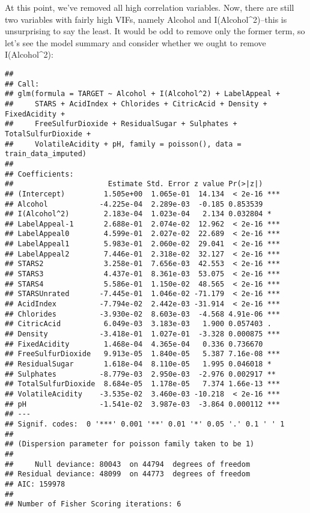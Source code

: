 \documentclass[
]{article}
\begin{document}
At this point, we've removed all high correlation variables. Now, there
are still two variables with fairly high VIFs, namely Alcohol and
I(Alcohol\^{}2)--this is unsurprising to say the least. It would be odd
to remove only the former term, so let's see the model summary and
consider whether we ought to remove I(Alcohol\^{}2):

\begin{verbatim}
## 
## Call:
## glm(formula = TARGET ~ Alcohol + I(Alcohol^2) + LabelAppeal + 
##     STARS + AcidIndex + Chlorides + CitricAcid + Density + FixedAcidity + 
##     FreeSulfurDioxide + ResidualSugar + Sulphates + TotalSulfurDioxide + 
##     VolatileAcidity + pH, family = poisson(), data = train_data_imputed)
## 
## Coefficients:
##                      Estimate Std. Error z value Pr(>|z|)    
## (Intercept)         1.505e+00  1.065e-01  14.134  < 2e-16 ***
## Alcohol            -4.225e-04  2.289e-03  -0.185 0.853539    
## I(Alcohol^2)        2.183e-04  1.023e-04   2.134 0.032804 *  
## LabelAppeal-1       2.688e-01  2.074e-02  12.962  < 2e-16 ***
## LabelAppeal0        4.599e-01  2.027e-02  22.689  < 2e-16 ***
## LabelAppeal1        5.983e-01  2.060e-02  29.041  < 2e-16 ***
## LabelAppeal2        7.446e-01  2.318e-02  32.127  < 2e-16 ***
## STARS2              3.258e-01  7.656e-03  42.553  < 2e-16 ***
## STARS3              4.437e-01  8.361e-03  53.075  < 2e-16 ***
## STARS4              5.586e-01  1.150e-02  48.565  < 2e-16 ***
## STARSUnrated       -7.445e-01  1.046e-02 -71.179  < 2e-16 ***
## AcidIndex          -7.794e-02  2.442e-03 -31.914  < 2e-16 ***
## Chlorides          -3.930e-02  8.603e-03  -4.568 4.91e-06 ***
## CitricAcid          6.049e-03  3.183e-03   1.900 0.057403 .  
## Density            -3.418e-01  1.027e-01  -3.328 0.000875 ***
## FixedAcidity        1.468e-04  4.365e-04   0.336 0.736670    
## FreeSulfurDioxide   9.913e-05  1.840e-05   5.387 7.16e-08 ***
## ResidualSugar       1.618e-04  8.110e-05   1.995 0.046018 *  
## Sulphates          -8.779e-03  2.950e-03  -2.976 0.002917 ** 
## TotalSulfurDioxide  8.684e-05  1.178e-05   7.374 1.66e-13 ***
## VolatileAcidity    -3.535e-02  3.460e-03 -10.218  < 2e-16 ***
## pH                 -1.541e-02  3.987e-03  -3.864 0.000112 ***
## ---
## Signif. codes:  0 '***' 0.001 '**' 0.01 '*' 0.05 '.' 0.1 ' ' 1
## 
## (Dispersion parameter for poisson family taken to be 1)
## 
##     Null deviance: 80043  on 44794  degrees of freedom
## Residual deviance: 48099  on 44773  degrees of freedom
## AIC: 159978
## 
## Number of Fisher Scoring iterations: 6
\end{verbatim}
\end{document}
